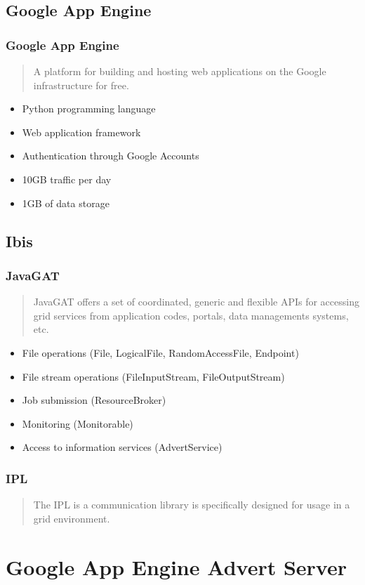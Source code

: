 \documentclass{beamer}
\begin{document}
\subsection{Google App Engine}
\frame
{
	\frametitle{Google App Engine}
	\begin{quote}
    A platform for building and hosting web applications on
	the Google infrastructure for free.
    \end{quote}
	
	\begin{itemize}
      \item Python programming language
      \item Web application framework
      \item Authentication through Google Accounts
      \item 10GB traffic per day
      \item 1GB of data storage
    \end{itemize}
}

\subsection{Ibis}
\frame
{
	\frametitle{JavaGAT}
	\begin{quote}
    JavaGAT offers a set of coordinated, generic and flexible APIs for accessing
    grid services from application codes, portals, data managements systems, etc.
    \end{quote}
	
	\begin{itemize}
      \item File operations (File, LogicalFile, RandomAccessFile, Endpoint)
      \item File stream operations (FileInputStream, FileOutputStream)
      \item Job submission (ResourceBroker)
      \item Monitoring (Monitorable)
      \item Access to information services (AdvertService)
    \end{itemize}
}

\frame
{
	\frametitle{IPL}
	\begin{quote}
    The IPL is a communication library is specifically designed for usage in a
    grid environment.
    \end{quote}
}

\section{Google App Engine Advert Server}
\end{document}

